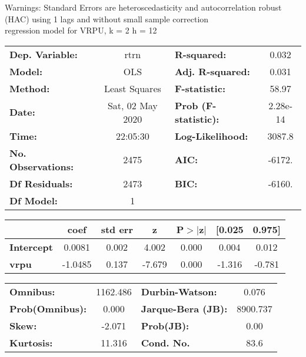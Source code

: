 Warnings: \newline
 [1] Standard Errors are heteroscedasticity and autocorrelation robust (HAC) using 1 lags and without small sample correction\\ 

regression model for VRPU, k = 2 h = 12\begin{center}
\begin{tabular}{lclc}
\toprule
\textbf{Dep. Variable:}    &       rtrn       & \textbf{  R-squared:         } &     0.032   \\
\textbf{Model:}            &       OLS        & \textbf{  Adj. R-squared:    } &     0.031   \\
\textbf{Method:}           &  Least Squares   & \textbf{  F-statistic:       } &     58.97   \\
\textbf{Date:}             & Sat, 02 May 2020 & \textbf{  Prob (F-statistic):} &  2.28e-14   \\
\textbf{Time:}             &     22:05:30     & \textbf{  Log-Likelihood:    } &    3087.8   \\
\textbf{No. Observations:} &        2475      & \textbf{  AIC:               } &    -6172.   \\
\textbf{Df Residuals:}     &        2473      & \textbf{  BIC:               } &    -6160.   \\
\textbf{Df Model:}         &           1      & \textbf{                     } &             \\
\bottomrule
\end{tabular}
\begin{tabular}{lcccccc}
                   & \textbf{coef} & \textbf{std err} & \textbf{z} & \textbf{P$> |$z$|$} & \textbf{[0.025} & \textbf{0.975]}  \\
\midrule
\textbf{Intercept} &       0.0081  &        0.002     &     4.002  &         0.000        &        0.004    &        0.012     \\
\textbf{vrpu}      &      -1.0485  &        0.137     &    -7.679  &         0.000        &       -1.316    &       -0.781     \\
\bottomrule
\end{tabular}
\begin{tabular}{lclc}
\textbf{Omnibus:}       & 1162.486 & \textbf{  Durbin-Watson:     } &    0.076  \\
\textbf{Prob(Omnibus):} &   0.000  & \textbf{  Jarque-Bera (JB):  } & 8900.737  \\
\textbf{Skew:}          &  -2.071  & \textbf{  Prob(JB):          } &     0.00  \\
\textbf{Kurtosis:}      &  11.316  & \textbf{  Cond. No.          } &     83.6  \\
\bottomrule
\end{tabular}
\end{center}

